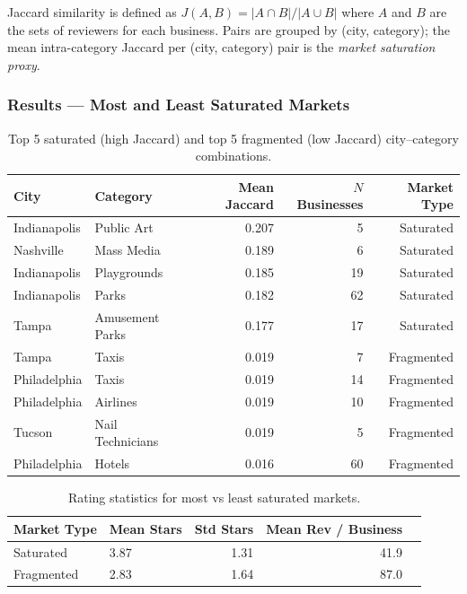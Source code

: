 \documentclass[11pt,a4paper]{article}
\begin{document}
Jaccard similarity is defined as
$J(A,B) = |A \cap B| / |A \cup B|$
where $A$ and $B$ are the sets of reviewers for each business.
Pairs are grouped by (city, category); the mean intra-category Jaccard
per (city, category) pair is the \emph{market saturation proxy}.

\subsubsection*{Results — Most and Least Saturated Markets}

\begin{table}[H]
\centering\small
\caption{Top 5 saturated (high Jaccard) and top 5 fragmented (low Jaccard) city–category combinations.}
\begin{tabular}{llrrr}
\toprule
\textbf{City} & \textbf{Category} & \textbf{Mean Jaccard} & \textbf{$N$ Businesses} & \textbf{Market Type}\\
\midrule
Indianapolis & Public Art        & 0.207 &  5 & Saturated\\
Nashville    & Mass Media        & 0.189 &  6 & Saturated\\
Indianapolis & Playgrounds       & 0.185 & 19 & Saturated\\
Indianapolis & Parks             & 0.182 & 62 & Saturated\\
Tampa        & Amusement Parks   & 0.177 & 17 & Saturated\\
\midrule
Tampa        & Taxis             & 0.019 &  7 & Fragmented\\
Philadelphia & Taxis             & 0.019 & 14 & Fragmented\\
Philadelphia & Airlines          & 0.019 & 10 & Fragmented\\
Tucson       & Nail Technicians  & 0.019 &  5 & Fragmented\\
Philadelphia & Hotels            & 0.016 & 60 & Fragmented\\
\bottomrule
\end{tabular}
\end{table}

\begin{table}[H]
\centering\small
\caption{Rating statistics for most vs least saturated markets.}
\begin{tabular}{llrrr}
\toprule
\textbf{Market Type} & \textbf{Mean Stars} & \textbf{Std Stars} & \textbf{Mean Rev / Business}\\
\midrule
Saturated  & 3.87 & 1.31 &  41.9\\
Fragmented & 2.83 & 1.64 &  87.0\\
\bottomrule
\end{tabular}
\end{table}
\end{document}
